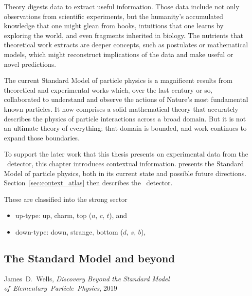 Theory digests data to extract useful information.
Those data include not only observations from scientific experiments,
but the humanity's accumulated knowledge that one might glean from books,
intuitions that one learns by exploring the world,
and even fragments inherited in biology.
The nutrients that theoretical work extracts are deeper concepts,
such as postulates or mathematical models,
which might reconstruct implications of the data and make useful or novel
predictions.

The current Standard Model of particle physics is a magnificent results from
theoretical and experimental works which, over the last century or
so, collaborated to understand and observe the actions of Nature's most
fundamental known particles.
It now comprises a solid mathematical theory that accurately describes the
physics of particle interactions across a broad domain.
But it is not an ultimate theory of everything; that domain is bounded, and
work continues to expand those boundaries.

To support the later work that this thesis presents on experimental data from
the \atlas\ detector, this chapter introduces contextual information.
 presents the Standard Model of particle
physics, both in its current state and possible future directions.
Section~\ref{sec:context_atlas} then describes the \atlas\ detector.


These are classified into the strong sector
\begin{itemize}
\item up-type: up, charm, top ($u$, $c$, $t$), and
\item down-type: down, strange, bottom ($d$, $s$, $b$),
\end{itemize}


\begin{singlespacing}
\section{The Standard Model and beyond}
\label{sec:context_sm_and_beyond}
%
\begin{epigraphs}
%
{James~D.~Wells,
\textit{Discovery Beyond the Standard Model of~Elementary~Particle~Physics},
2019~\cite{wells2020discovery}}
\end{epigraphs}
\end{singlespacing}


